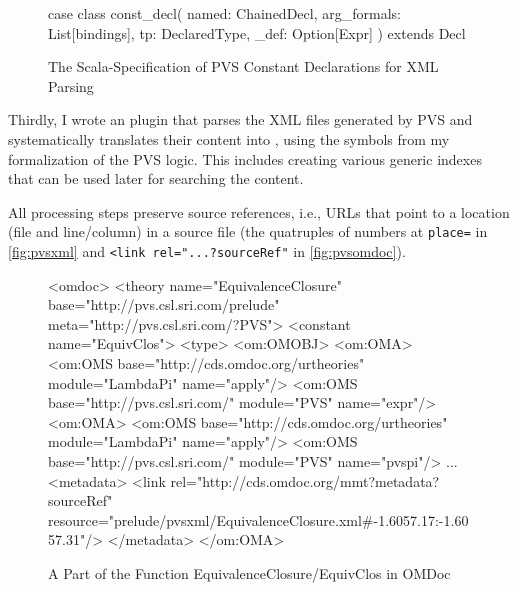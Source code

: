 \begin{figure}[ht]\centering
\begin{scalacode}
case class const_decl(
    named: ChainedDecl,
    arg_formals: List[bindings],
    tp: DeclaredType, 
    _def: Option[Expr]
) extends Decl
\end{scalacode}
\caption{The Scala-Specification of PVS Constant Declarations for XML Parsing}\label{fig:pvsscala}
\end{figure}

Thirdly, I wrote an \mmt plugin that parses the XML files generated by PVS and systematically translates their content into \ommt, using the symbols from my formalization of the PVS logic.  This includes creating various generic indexes that can be used later
for searching the content.

All processing steps preserve source references, i.e., URLs that point to a location (file
and line/column) in a source file (the quatruples of numbers at \lstinline|place=| in \autoref{fig:pvsxml} and
\lstinline|<link rel="...?sourceRef"| in \autoref{fig:pvsomdoc}).

\begin{figure}[ht]\centering
\begin{code}[basicstyle=\sf\scriptsize]
<omdoc>
 <theory name="EquivalenceClosure"
  base="http://pvs.csl.sri.com/prelude"
  meta="http://pvs.csl.sri.com/?PVS">
  <constant name="EquivClos">
   <type>
    <om:OMOBJ>
     <om:OMA>
      <om:OMS base="http://cds.omdoc.org/urtheories" module="LambdaPi" name="apply"/>
      <om:OMS base="http://pvs.csl.sri.com/" module="PVS" name="expr"/>
      <om:OMA>
       <om:OMS base="http://cds.omdoc.org/urtheories" module="LambdaPi" name="apply"/>
       <om:OMS base="http://pvs.csl.sri.com/" module="PVS" name="pvspi"/>
        ...
        <metadata>
         <link rel="http://cds.omdoc.org/mmt?metadata?sourceRef"
           resource="prelude/pvsxml/EquivalenceClosure.xml#-1.6057.17:-1.6057.31"/>
        </metadata>
      </om:OMA>
\end{code}
\caption{A Part of the Function EquivalenceClosure/EquivClos in OMDoc \protect\footnotemark}\label{fig:pvsomdoc}
\end{figure}

